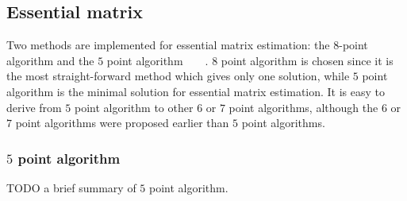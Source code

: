 \subsection{Essential matrix}
Two methods are implemented for essential matrix estimation: the $8$-point algorithm and the $5$ point algorithm~\cite{nister2003efficient}~\cite{li2006five}~\cite{triggs2000routines}~\cite{nister2004efficient}. $8$ point algorithm is chosen since it is the most straight-forward method which gives only one solution, while $5$ point algorithm is the minimal solution for essential matrix estimation. It is easy to derive from $5$ point algorithm to other $6$ or $7$ point algorithms, although the $6$ or $7$ point algorithms were proposed earlier than $5$ point algorithms.

\subsubsection{$5$ point algorithm}
TODO a brief summary of $5$ point algorithm.

